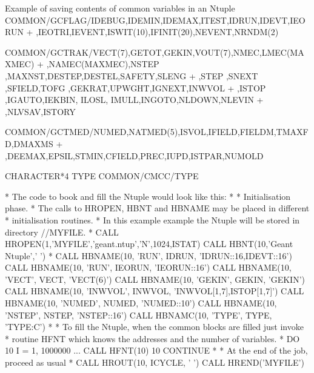 \begin{XMPt}{Example of saving contents of common variables in an Ntuple}
        COMMON/GCFLAG/IDEBUG,IDEMIN,IDEMAX,ITEST,IDRUN,IDEVT,IEORUN
       +        ,IEOTRI,IEVENT,ISWIT(10),IFINIT(20),NEVENT,NRNDM(2)

        COMMON/GCTRAK/VECT(7),GETOT,GEKIN,VOUT(7),NMEC,LMEC(MAXMEC)
       + ,NAMEC(MAXMEC),NSTEP ,MAXNST,DESTEP,DESTEL,SAFETY,SLENG
       + ,STEP  ,SNEXT ,SFIELD,TOFG  ,GEKRAT,UPWGHT,IGNEXT,INWVOL
       + ,ISTOP ,IGAUTO,IEKBIN, ILOSL, IMULL,INGOTO,NLDOWN,NLEVIN
       + ,NLVSAV,ISTORY

        COMMON/GCTMED/NUMED,NATMED(5),ISVOL,IFIELD,FIELDM,TMAXFD,DMAXMS
       +      ,DEEMAX,EPSIL,STMIN,CFIELD,PREC,IUPD,ISTPAR,NUMOLD

        CHARACTER*4 TYPE
        COMMON/CMCC/TYPE

*     The code to book and fill the Ntuple would look like this:
*
*   Initialisation phase.
*   The calls to HROPEN, HBNT and HBNAME may be placed in different 
*   initialisation routines. 
*   In this example example the Ntuple will be stored in directory //MYFILE.
*
        CALL HROPEN(1,'MYFILE','geant.ntup','N',1024,ISTAT)
        CALL HBNT(10,'Geant Ntuple',' ')
*
        CALL HBNAME(10, 'RUN',    IDRUN,  'IDRUN::16,IDEVT::16')
        CALL HBNAME(10, 'RUN',    IEORUN, 'IEORUN::16')
        CALL HBNAME(10, 'VECT',   VECT,   'VECT(6)')
        CALL HBNAME(10, 'GEKIN',  GEKIN,  'GEKIN')
        CALL HBNAME(10, 'INWVOL', INWVOL, 'INWVOL[1,7],ISTOP[1,7]')
        CALL HBNAME(10, 'NUMED',  NUMED,  'NUMED::10')
        CALL HBNAME(10, 'NSTEP',  NSTEP,  'NSTEP::16')
        CALL HBNAMC(10, 'TYPE',   TYPE,   'TYPE:C')
*
*    To fill the Ntuple, when the common blocks are filled just invoke
*    routine HFNT which knows the addresses and the number of variables.
*
        DO 10 I = 1, 1000000
           ...
           CALL HFNT(10)
10      CONTINUE
*
*                      At the end of the job, proceed as usual
*
        CALL HROUT(10, ICYCLE, ' ')
        CALL HREND('MYFILE')

\end{XMPt}

\newpage%

